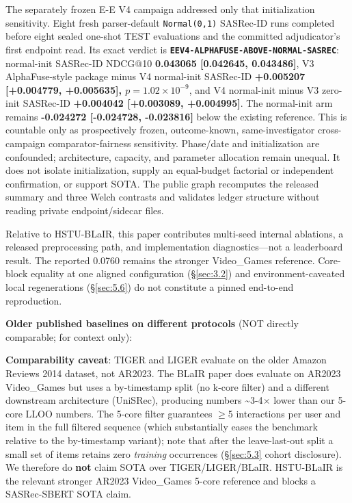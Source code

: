 The separately frozen E-E V4 campaign addressed only that initialization sensitivity. Eight fresh parser-default \texttt{Normal(0,1)} SASRec-ID runs completed before eight sealed one-shot TEST evaluations and the committed adjudicator's first endpoint read. Its exact verdict is \textbf{\texttt{EEV4-ALPHAFUSE-ABOVE-NORMAL-SASREC}}: normal-init SASRec-ID NDCG@10 \textbf{0.043065 [0.042645, 0.043486]}, V3 AlphaFuse-style package minus V4 normal-init SASRec-ID \textbf{+0.005207 [+0.004779, +0.005635], \ensuremath{p=1.02\times10^{-9}}}, and V4 normal-init minus V3 zero-init SASRec-ID \textbf{+0.004042 [+0.003089, +0.004995]}. The normal-init arm remains \textbf{-0.024272 [-0.024728, -0.023816]} below the existing reference. This is countable only as prospectively frozen, outcome-known, same-investigator cross-campaign comparator-fairness sensitivity. Phase/date and initialization are confounded; architecture, capacity, and parameter allocation remain unequal. It does not isolate initialization, supply an equal-budget factorial or independent confirmation, or support SOTA. The public graph recomputes the released summary and three Welch contrasts and validates ledger structure without reading private endpoint/sidecar files.

Relative to HSTU-BLaIR, this paper contributes multi-seed internal ablations, a released preprocessing path, and implementation diagnostics---not a leaderboard result. The reported 0.0760 remains the stronger Video\_Games reference. Core-block equality at one aligned configuration (\S\ref{sec:3.2}) and environment-caveated local regenerations (\S\ref{sec:5.6}) do not constitute a pinned end-to-end reproduction.

\ifextendedmaterial

\textbf{Older published baselines on different protocols} (NOT directly comparable; for context only):



\textbf{Comparability caveat}: TIGER and LIGER evaluate on the older Amazon Reviews 2014 dataset, not AR2023. The BLaIR paper does evaluate on AR2023 Video\_Games but uses a by-timestamp split (no k-core filter) and a different downstream architecture (UniSRec), producing numbers \textasciitilde{}3-4\ensuremath{\times} lower than our 5-core LLOO numbers. The 5-core filter guarantees \ensuremath{\ge}5 interactions per user and item in the full filtered sequence (which substantially eases the benchmark relative to the by-timestamp variant); note that after the leave-last-out split a small set of items retains zero \emph{training} occurrences (\S\ref{sec:5.3} cohort disclosure). We therefore do \textbf{not} claim SOTA over TIGER/LIGER/BLaIR. HSTU-BLaIR is the relevant stronger AR2023 Video\_Games 5-core reference and blocks a SASRec-SBERT SOTA claim.

